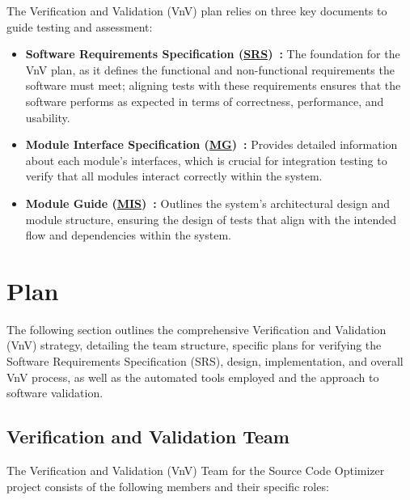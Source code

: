 \documentclass[12pt, titlepage]{article}
\newcommand{\SRS}{\href{https://github.com/ssm-lab/capstone--source-code-optimizer/blob/main/docs/SRS/SRS.pdf}{SRS}}
\newcommand{\MG}{\href{https://github.com/ssm-lab/capstone--source-code-optimizer/blob/main/docs/Design/SoftArchitecture/MG.pdf}{MG}}
\newcommand{\MIS}{\href{https://github.com/ssm-lab/capstone--source-code-optimizer/blob/main/docs/Design/SoftDetailedDes/MIS.pdf}{MIS}}
\begin{document}
The Verification and Validation (VnV) plan relies on three key
documents to guide testing and assessment:
\begin{itemize}
  \item[] \textbf{Software Requirements Specification
    (\SRS)~\cite{SRS}:} The foundation for the VnV plan, as it
    defines the functional and non-functional requirements the
    software must meet; aligning tests with these requirements
    ensures that the software performs as expected in terms of
    correctness, performance, and usability.

  \item[] \textbf{Module Interface Specification (\MG)~\cite{MGDoc}:}
    Provides detailed information about each module's interfaces,
    which is crucial for integration testing to verify that all
    modules interact correctly within the system.

  \item[] \textbf{Module Guide (\MIS)~\cite{MISDoc}:} Outlines the
    system's architectural design and module structure, ensuring the
    design of tests that align with the intended flow and
    dependencies within the system.
\end{itemize}

\section{Plan}

The following section outlines the comprehensive Verification and
Validation (VnV) strategy, detailing the team structure, specific
plans for verifying the Software Requirements Specification (SRS),
design, implementation, and overall VnV process, as well as the
automated tools employed and the approach to software validation.

\subsection{Verification and Validation Team}

The Verification and Validation (VnV) Team for the Source Code
Optimizer project consists of the following members and their specific roles:
\end{document}
